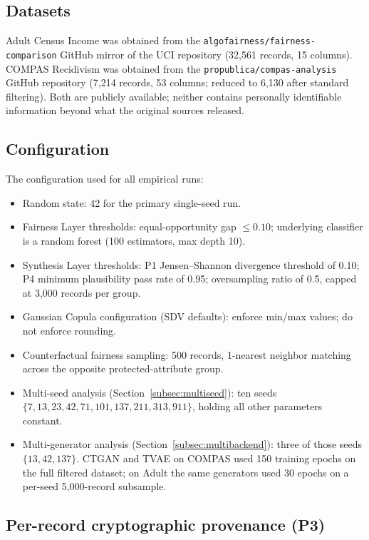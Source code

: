 \documentclass[11pt]{article}
\begin{document}
\subsection{Datasets}

Adult Census Income was obtained from the \texttt{algofairness/fairness-comparison} GitHub mirror of the UCI repository (32,561 records, 15 columns). COMPAS Recidivism was obtained from the \texttt{propublica/compas-analysis} GitHub repository (7,214 records, 53 columns; reduced to 6,130 after standard filtering). Both are publicly available; neither contains personally identifiable information beyond what the original sources released.

\subsection{Configuration}

The configuration used for all empirical runs:
\begin{itemize}[leftmargin=*, itemsep=1pt]
  \item Random state: 42 for the primary single-seed run.
  \item Fairness Layer thresholds: equal-opportunity gap $\leq 0.10$; underlying classifier is a random forest (100 estimators, max depth 10).
  \item Synthesis Layer thresholds: P1 Jensen--Shannon divergence threshold of 0.10; P4 minimum plausibility pass rate of 0.95; oversampling ratio of 0.5, capped at 3,000 records per group.
  \item Gaussian Copula configuration (SDV defaults): enforce min/max values; do not enforce rounding.
  \item Counterfactual fairness sampling: 500 records, 1-nearest neighbor matching across the opposite protected-attribute group.
  \item Multi-seed analysis (Section~\ref{subsec:multiseed}): ten seeds $\{7, 13, 23, 42, 71, 101, 137, 211, 313, 911\}$, holding all other parameters constant.
  \item Multi-generator analysis (Section~\ref{subsec:multibackend}): three of those seeds $\{13, 42, 137\}$. CTGAN and TVAE on COMPAS used 150 training epochs on the full filtered dataset; on Adult the same generators used 30 epochs on a per-seed 5,000-record subsample.
\end{itemize}

\subsection{Per-record cryptographic provenance (P3)}
\end{document}
